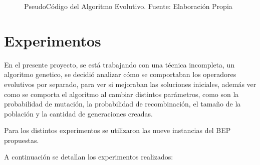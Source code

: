 \documentclass[letter, 10pt]{article}
\begin{document}
\begin{figure}[h]
\centering

\begin{center}

    \begin{algorithmic}
            \Else
            \EndIf
        \EndWhile
        
    \EndFor
    \end{algorithmic}
\end{center}

\caption{PseudoCódigo del Algoritmo Evolutivo. Fuente: Elaboración Propia}
\label{fig:algorithm}
\end{figure}



\section{Experimentos}

En el presente proyecto, se está trabajando con una técnica incompleta, un algoritmo genetico, se decidió analizar cómo se comportaban los operadores evolutivos por separado, para ver si mejoraban las soluciones iniciales, además ver como se comporta el algoritmo al cambiar distintos parámetros, como son la probabilidad de mutación, la probabilidad de recombinación, el tamaño de la población y la cantidad de generaciones creadas.

Para los distintos experimentos se utilizaron las nueve instancias del BEP propuestas.

A continuación se detallan los experimentos realizados:
\end{document}
